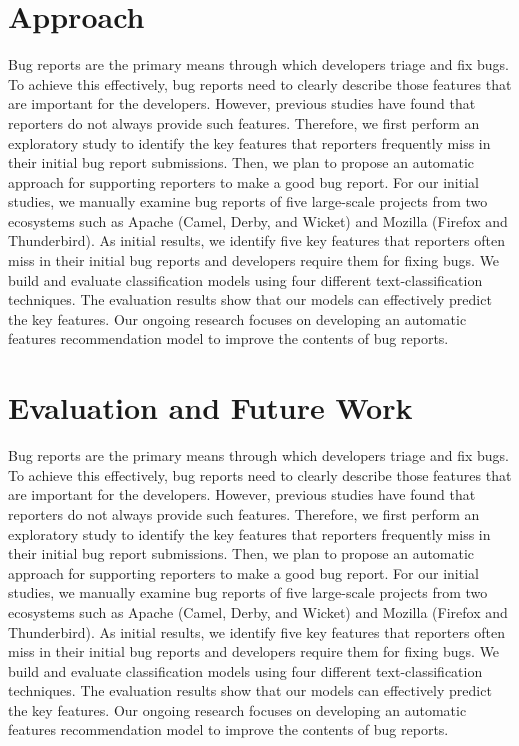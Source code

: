 \documentclass[sigconf,authordraft]{acmart}
\begin{document}
\section{Approach}
Bug reports are the primary means through which developers triage and fix bugs. To achieve this effectively, bug reports need to clearly describe those features that are important for the developers. However, previous studies have found that reporters do not always provide such features. Therefore, we first perform an exploratory study to identify the key features that reporters frequently miss in their initial bug report submissions. Then, we plan to propose an automatic approach for supporting reporters to make a good bug report. For our initial studies, we manually examine bug reports of five large-scale projects from two ecosystems such as Apache (Camel, Derby, and Wicket) and Mozilla (Firefox and Thunderbird). As initial results, we identify five key features that reporters often miss in their initial bug reports and developers require them for fixing bugs. We build and evaluate classification models using four different text-classification techniques. The evaluation results show that our models can effectively predict the key features. Our ongoing research focuses on developing an automatic features recommendation model to improve the contents of bug reports. 
\section{Evaluation and Future Work}
Bug reports are the primary means through which developers triage and fix bugs. To achieve this effectively, bug reports need to clearly describe those features that are important for the developers. However, previous studies have found that reporters do not always provide such features. Therefore, we first perform an exploratory study to identify the key features that reporters frequently miss in their initial bug report submissions. Then, we plan to propose an automatic approach for supporting reporters to make a good bug report. For our initial studies, we manually examine bug reports of five large-scale projects from two ecosystems such as Apache (Camel, Derby, and Wicket) and Mozilla (Firefox and Thunderbird). As initial results, we identify five key features that reporters often miss in their initial bug reports and developers require them for fixing bugs. We build and evaluate classification models using four different text-classification techniques. The evaluation results show that our models can effectively predict the key features. Our ongoing research focuses on developing an automatic features recommendation model to improve the contents of bug reports. 
\end{document}
